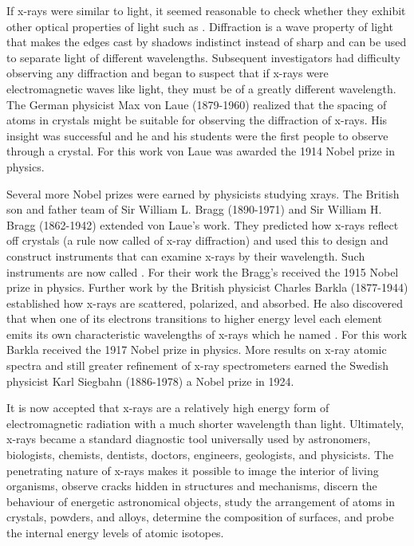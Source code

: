 \documentclass[12pt, a4paper, oneside, openright, titlepage]{book}
\begin{document}
\noindent If x-rays were similar to light, it seemed reasonable to check whether they exhibit other optical properties of light such as . Diffraction is a wave property of light that makes the edges cast by shadows indistinct instead of sharp and can be used to separate light of different wavelengths. Subsequent investigators had difficulty observing any diffraction and began to suspect that if x-rays were electromagnetic waves like light, they must be of a greatly different wavelength. The German physicist Max von Laue (1879-1960) realized that the spacing of atoms in crystals might be suitable for observing the diffraction of x-rays. His insight was successful and he and his students were the first people to observe  through a crystal. For this work von Laue was awarded the 1914 Nobel prize in physics.

\noindent Several more Nobel prizes were earned by physicists studying xrays. The British son and father team of Sir William L. Bragg (1890-1971) and Sir William H. Bragg (1862-1942) extended von Laue’s work. They predicted how x-rays reflect off crystals (a rule now called  of x-ray diffraction) and used this to design and construct instruments that can examine x-rays by their wavelength. Such instruments are now called . For their work the Bragg’s received the 1915 Nobel prize in physics. Further work by the British physicist Charles Barkla (1877-1944) established how x-rays are scattered, polarized, and absorbed. He also discovered that when one of its electrons transitions to higher energy level each element emits its own characteristic wavelengths of x-rays which he named . For this work Barkla received the 1917 Nobel prize in physics. More results on x-ray atomic spectra and still greater refinement of x-ray spectrometers earned the Swedish physicist Karl Siegbahn (1886-1978) a Nobel prize in 1924.


\noindent It is now accepted that x-rays are a relatively high energy form of electromagnetic radiation with a much shorter wavelength than light. Ultimately, x-rays became a standard diagnostic tool universally used by astronomers, biologists, chemists, dentists, doctors, engineers, geologists, and physicists. The penetrating nature of x-rays makes it possible to image the interior of living organisms, observe cracks hidden in structures and mechanisms, discern the behaviour of energetic astronomical objects, study the arrangement of atoms in crystals, powders, and alloys, determine the composition of surfaces, and probe the internal energy levels of atomic isotopes.
\end{document}

